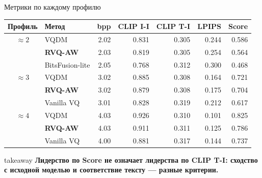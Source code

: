 \documentclass[aspectratio=169,10pt]{beamer}
\newcommand{\keypoint}[1]{%
  \begin{beamercolorbox}[
    sep=1.8mm,
    wd=\linewidth
  ]{takeaway}
    \small\bfseries #1
  \end{beamercolorbox}%
}
\newcommand{\rvq}{\textbf{RVQ-AW}}
\begin{document}

\begin{frame}[t]{Метрики по каждому профилю}
  \begin{center}
    \small
    \renewcommand{\arraystretch}{1.15}
    \setlength{\tabcolsep}{2.5mm}

    \begin{tabular}{clrrrrr}
      \toprule

      \textbf{Профиль}
        & \textbf{Метод}
        & \textbf{bpp}
        & \textbf{CLIP I-I}
        & \textbf{CLIP T-I}
        & \textbf{LPIPS}
        & \textbf{Score} \\

      \midrule

      $\approx 2$
        & VQDM
        & 2.02 & 0.831 & 0.305 & 0.244 & 0.586 \\

      \rowcolor{Tint}
        & \rvq
        & 2.03 & 0.819 & 0.305 & 0.254 & 0.564 \\

        & BitsFusion-lite
        & 2.05 & 0.768 & 0.312 & 0.300 & 0.468 \\

      \midrule

      $\approx 3$
        & VQDM
        & 3.02 & 0.885 & 0.308 & 0.164 & 0.721 \\

      \rowcolor{Tint}
        & \rvq
        & 3.02 & 0.879 & 0.308 & 0.175 & 0.704 \\

        & Vanilla VQ
        & 3.01 & 0.828 & 0.319 & 0.212 & 0.617 \\

      \midrule

      $\approx 4$
        & VQDM
        & 4.03 & 0.926 & 0.310 & 0.101 & 0.825 \\

      \rowcolor{Tint}
        & \rvq
        & 4.03 & 0.911 & 0.311 & 0.125 & 0.786 \\

        & Vanilla VQ
        & 4.00 & 0.881 & 0.317 & 0.144 & 0.737 \\

      \bottomrule
    \end{tabular}
  \end{center}

  \vfill

  \keypoint{
    Лидерство по Score не означает лидерства по CLIP T-I:
    сходство с исходной моделью и соответствие тексту ---
    разные критерии.
  }
\end{frame}
\end{document}
